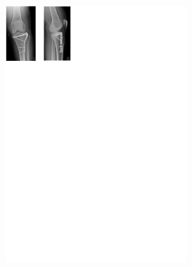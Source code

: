 \documentclass[a4paper]{article}
\newenvironment{Figure}
	{\par\medskip\noindent\minipage{\linewidth}}
	{\endminipage\par\medskip}
\begin{document}
\begin{multicols*}{2}
				\begin{Figure}
					\centering
					\includegraphics[trim={0cm 23.2cm 13.4cm 0},clip,width=7cm]{images/figure4_xray_postop.pdf}
					\label{fig:xray-postop}
				\end{Figure}
			
	\end{multicols*}
\end{document}
